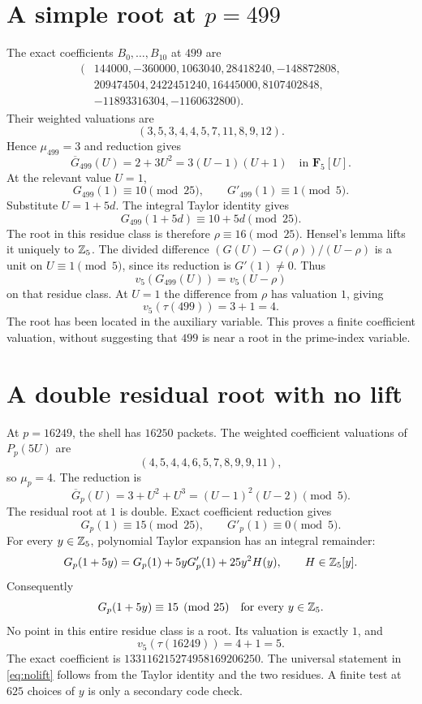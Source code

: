 \section{A simple root at \texorpdfstring{$p=499$}{p=499}}
The exact coefficients $B_0,\ldots,B_{10}$ at $499$ are
\begin{align*}
(&144000,-360000,1063040,28418240,-148872808,\\
&209474504,2422451240,16445000,8107402848,\\
&-11893316304,-1160632800).
\end{align*}
Their weighted valuations are
\[
(3,5,3,4,4,5,7,11,8,9,12).
\]
Hence $\mu_{499}=3$ and reduction gives
\[
\overline G_{499}(U)=2+3U^2=3(U-1)(U+1)\quad\text{in }\mathbf F_5[U].
\]
At the relevant value $U=1$,
\[
G_{499}(1)\equiv10\pmod{25},\qquad G'_{499}(1)\equiv1\pmod5.
\]
Substitute $U=1+5d$. The integral Taylor identity gives
\[
G_{499}(1+5d)\equiv10+5d\pmod{25}.
\]
The root in this residue class is therefore $\rho\equiv16\pmod{25}$. Hensel's lemma lifts it uniquely to $\mathbb Z_5$. The divided difference $(G(U)-G(\rho))/(U-\rho)$ is a unit on $U\equiv1\pmod5$, since its reduction is $G'(1)\ne0$. Thus
\[
v_5(G_{499}(U))=v_5(U-\rho)
\]
on that residue class. At $U=1$ the difference from $\rho$ has valuation $1$, giving
\[
v_5(\tau(499))=3+1=4.
\]
The root has been located in the auxiliary variable. This proves a finite coefficient valuation, without suggesting that $499$ is near a root in the prime-index variable.

\section{A double residual root with no lift}
At $p=16249$, the shell has $16250$ packets. The weighted coefficient valuations of $P_p(5U)$ are
\[
(4,5,4,4,6,5,7,8,9,9,11),
\]
so $\mu_p=4$. The reduction is
\[
\overline G_p(U)=3+U^2+U^3=(U-1)^2(U-2)\pmod5.
\]
The residual root at $1$ is double. Exact coefficient reduction gives
\[
G_p(1)\equiv15\pmod{25},\qquad G'_p(1)\equiv0\pmod5.
\]
For every $y\in\mathbb Z_5$, polynomial Taylor expansion has an integral remainder:
\[
G_p(1+5y)=G_p(1)+5yG'_p(1)+25y^2H(y),\qquad H\in\mathbb Z_5[y].
\]
Consequently
\begin{equation}\label{eq:nolift}
G_p(1+5y)\equiv15\pmod{25}\quad\text{for every }y\in\mathbb Z_5.
\end{equation}
No point in this entire residue class is a root. Its valuation is exactly $1$, and
\[
v_5(\tau(16249))=4+1=5.
\]
The exact coefficient is $133116215274958169206250$. The universal statement in \eqref{eq:nolift} follows from the Taylor identity and the two residues. A finite test at $625$ choices of $y$ is only a secondary code check.

